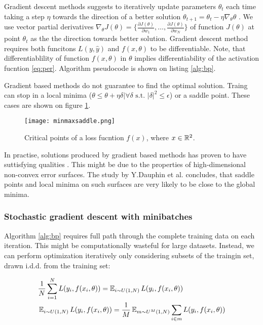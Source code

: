 Gradient descent methods suggests to iteratively update parameters $\theta_t$ each time taking a step $\eta$ towards the direction of a better solution $\theta_{t+1}=\theta_t - \eta \nabla_\theta \theta$ \cite{Cauchy1847}.
We use vector partial derivatives $\nabla_\theta J(\theta)=\{ \frac{\partial J(\theta)}{\partial w_1}, \ldots, \frac{\partial J(\theta)}{\partial w_N} \}$ of function $J(\theta)$ at point $\theta_t$ as the the direction towards better solution. Gradient descent method requires both funcitons $L(y, \hat{y})$ and $f(x, \theta)$ to be differentiable. Note, that differentiablility of function $f(x, \theta)$ in $\theta$ implies differentiability of the activation fucntion \ref{eq:per}. Algorithm pseudocode is shown on listing \ref{alg:bp}.



Gradient based methods do not guarantee to find the optimal solution.
Traing can stop in a local minima ($\theta \leq \theta + \eta \delta | \forall \delta \text{ s.t. } |\delta|^2 \leq \epsilon$) or a saddle point.
These cases are shown on figure \ref{fig:critical}.

\begin{figure}[h!]
  \centering
    \texttt{[image: minmaxsaddle.png]}
  \caption{Critical points of a loss fucntion $f(x)$, where $x \in \Bbb{R}^2$.}
  \label{fig:critical}
\end{figure}

In practise, solutions produced by gradient based methods has proven to have suttisfying qualities \cite{Szegedy2016,He2015}.
This might be due to the properties of high-dimensional non-convex error surfaces. The study by Y.Dauphin et al. \cite{Dauphin14} concludes, that saddle points and local minima on such surfaces are very likely to be close to the global minima.

\subsubsection{Stochastic gradient descent with minibatches}

Algorithm \ref{alg:bp} requires full path through the complete training data on each iteration.
This might be computationally wasteful for large datasets. Instead, we can perform optimization iteratively only considering subsets of the traingin set, drawn i.d.d. from the training set:

\begin{equation*}\label{eq:sopt}
  \begin{aligned}
  & \frac{1}{N} \sum_{i=1}^{N} L(y_i, f(x_i, \theta)) = \operatorname{\mathbb{E}}_{i \sim U(1,N) } L(y_i, f(x_i, \theta)) \\
  & \operatorname{\mathbb{E}}_{i \sim U(1,N) } L(y_i, f(x_i, \theta))= \frac{1}{M} \operatorname{\mathbb{E}}_{m \sim U^M(1,N) } \sum_{i \in m} L(y_i, f(x_i, \theta))
  \end{aligned}
\end{equation*}

